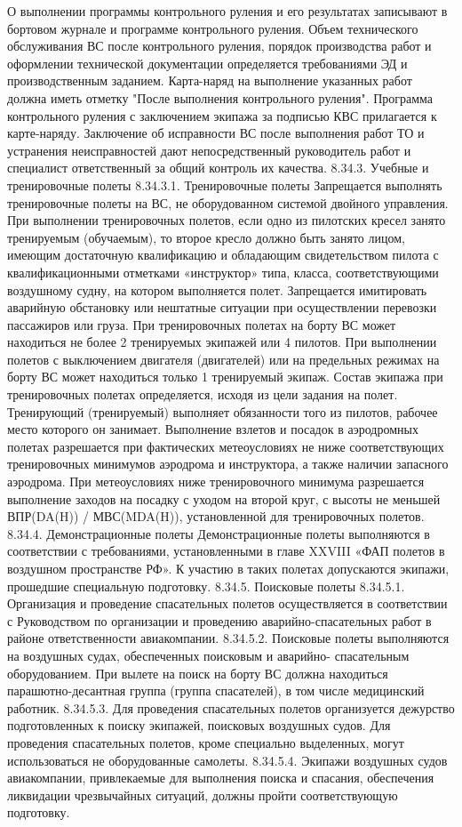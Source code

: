 О выполнении программы контрольного руления и его результатах записывают в бортовом журнале и программе контрольного руления.
Объем технического обслуживания ВС после контрольного руления, порядок производства работ и оформлении технической документации определяется требованиями ЭД и производственным заданием. Карта-наряд на выполнение указанных работ должна иметь отметку "После выполнения контрольного руления".
Программа контрольного руления с заключением экипажа за подписью КВС прилагается к карте-наряду.
Заключение об исправности ВС после выполнения работ ТО и устранения неисправностей дают непосредственный руководитель работ и специалист ответственный за общий контроль их качества.
8.34.3.	Учебные и тренировочные полеты
8.34.3.1.	Тренировочные полеты
Запрещается выполнять тренировочные полеты на ВС, не оборудованном системой двойного управления.
При выполнении тренировочных полетов, если одно из пилотских кресел занято тренируемым (обучаемым), то второе кресло должно быть занято лицом, имеющим достаточную квалификацию и обладающим свидетельством пилота с квалификационными отметками «инструктор» типа, класса, соответствующими воздушному судну, на котором выполняется полет.
Запрещается имитировать аварийную обстановку или нештатные ситуации при осуществлении перевозки пассажиров или груза.
При тренировочных полетах на борту ВС может находиться не более 2 тренируемых экипажей или 4 пилотов.
При выполнении полетов с выключением двигателя (двигателей) или на предельных режимах на борту ВС может находиться только 1 тренируемый экипаж.
Состав экипажа при тренировочных полетах определяется, исходя из цели задания на полет. Тренирующий (тренируемый) выполняет обязанности того из пилотов, рабочее место которого он занимает.
Выполнение взлетов и посадок в аэродромных полетах разрешается при фактических метеоусловиях не ниже соответствующих тренировочных минимумов аэродрома и инструктора, а также наличии запасного аэродрома. При метеоусловиях ниже тренировочного минимума разрешается выполнение заходов на посадку с уходом на второй круг, с высоты не меньшей ВПР(DA(H)) / МВС(MDA(H)), установленной для тренировочных полетов.
8.34.4.	Демонстрационные полеты
Демонстрационные полеты выполняются в соответствии с требованиями, установленными в главе XXVIII «ФАП полетов в воздушном пространстве РФ». К участию в таких полетах допускаются экипажи, прошедшие специальную подготовку.
8.34.5.	Поисковые полеты
8.34.5.1. Организация и проведение спасательных полетов осуществляется в соответствии с Руководством по организации и проведению аварийно-спасательных работ в районе ответственности авиакомпании.
8.34.5.2. Поисковые полеты выполняются на воздушных судах, обеспеченных поисковым и аварийно- спасательным оборудованием. При вылете на поиск на борту ВС должна находиться парашютно-десантная группа (группа спасателей), в том числе медицинский работник.
8.34.5.3. Для проведения спасательных полетов организуется дежурство подготовленных к поиску экипажей, поисковых воздушных судов. Для проведения спасательных полетов, кроме специально выделенных, могут использоваться не оборудованные самолеты.
8.34.5.4. Экипажи воздушных судов авиакомпании, привлекаемые для выполнения поиска и спасания, обеспечения ликвидации чрезвычайных ситуаций, должны пройти соответствующую подготовку. 

